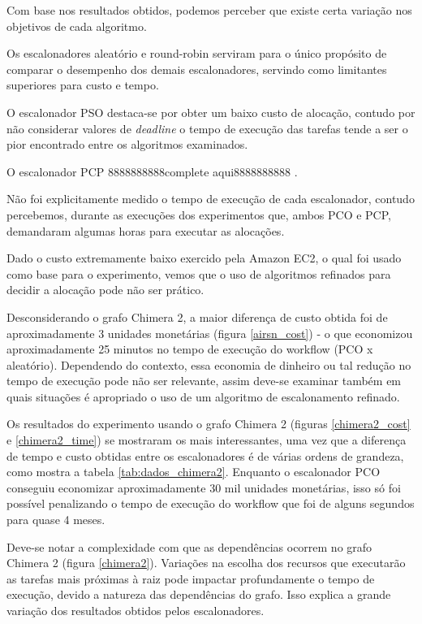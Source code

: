 \documentclass[a4paper,10pt]{article}
\begin{document}
Com base nos resultados obtidos, podemos perceber que existe certa variação nos
objetivos de cada algoritmo.

Os escalonadores aleatório e round-robin serviram para o único propósito de comparar
o desempenho dos demais escalonadores, servindo como limitantes superiores para custo
e tempo.

O escalonador PSO destaca-se por obter um baixo custo de alocação, contudo por não considerar
valores de \emph{deadline} o tempo de execução das tarefas tende a ser o pior encontrado
entre os algoritmos examinados.

O escalonador PCP   8888888888complete aqui8888888888 .

Não foi explicitamente medido o tempo de execução de cada escalonador, contudo percebemos,
durante as execuções dos experimentos que, ambos PCO e PCP, demandaram algumas horas para
executar as alocações.

Dado o custo extremamente baixo exercido pela Amazon EC2, o qual foi usado como base para
o experimento, vemos que o uso de algoritmos refinados para decidir a alocação pode não ser
prático.

Desconsiderando o grafo Chimera 2, a maior diferença de custo obtida foi de aproximadamente
3 unidades monetárias (figura \ref{airsn_cost}) - o que economizou aproximadamente
25 minutos no tempo de execução do workflow (PCO x aleatório).
Dependendo do contexto, essa economia de dinheiro ou tal redução no tempo de execução pode não
ser relevante, assim deve-se examinar também em quais situações é apropriado o uso de um algoritmo
de escalonamento refinado.

Os resultados do experimento usando o grafo Chimera 2 (figuras \ref{chimera2_cost} e \ref{chimera2_time})
se mostraram os mais interessantes, uma vez que a diferença de tempo e custo obtidas entre os escalonadores
é de várias ordens de grandeza, como mostra a tabela \ref{tab:dados_chimera2}. Enquanto o escalonador PCO
conseguiu economizar aproximadamente 30 mil unidades monetárias, isso só foi possível penalizando o tempo
de execução do workflow que foi de alguns segundos para quase 4 meses.

Deve-se notar a complexidade com que as dependências ocorrem no grafo Chimera 2 (figura \ref{chimera2}).
Variações na escolha dos recursos que executarão as tarefas mais próximas à raiz pode impactar profundamente
o tempo de execução, devido a natureza das dependências do grafo. Isso explica a grande variação dos resultados
obtidos pelos escalonadores.
\end{document}
